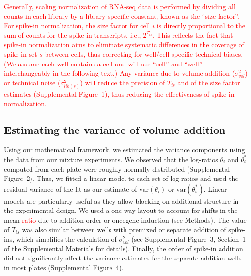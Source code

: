 \documentclass{article}
\newcommand{\suppfigschem}{1}
\newcommand{\suppfignorm}{2}
\newcommand{\suppfigtotals}{3}
\newcommand{\suppfigorder}{4}
\newcommand{\suppsecmath}{1}
\newcommand{\revised}[1]{\textcolor{red}{#1}}
\newcommand\variance{\mbox{var}}
\begin{document}
\revised{Generally, scaling normalization of RNA-seq data is performed by dividing all counts in each library by a library-specific constant, known as the ``size factor''.
For spike-in normalization, the size factor for cell $i$ is directly proportional to the sum of counts for the spike-in transcripts, i.e., $2^{T_{is}}$.
This reflects the fact that spike-in normalization aims to eliminate systematic differences in the coverage of spike-in set $s$ between cells, thus correcting for well/cell-specific technical biases.
(We assume each well contains a cell and will use ``cell'' and ``well'' interchangeably in the following text.)
Any variance due to volume addition ($\sigma^2_{vol}$) or technical noise ($\sigma^2_{lib(s)}$) will reduce the precision of $T_{is}$ and of the size factor estimates (Supplemental Figure~\suppfigschem{}), thus reducing the effectiveness of spike-in normalization.
}

\subsection*{Estimating the variance of volume addition}
Using our mathematical framework, we estimated the variance components using the data from our mixture experiments.
We observed that the log-ratios $\theta_i$ and $\theta^*_i$ computed from each plate were roughly normally distributed (Supplemental Figure~\suppfignorm{}).
Thus, we fitted a linear model to each set of log-ratios and used the residual variance of the fit as our estimate of $\variance(\theta_i)$ or $\variance(\theta^*_i)$.
Linear models are particularly useful as they allow blocking on additional structure in the experimental design.
We used a one-way layout to account for shifts in the mean \revised{ratio} due to addition order or oncogene induction (see Methods).
The value of $T_{is}$ was also similar between wells with premixed or separate addition of spike-ins, which simplifies the calculation of $\sigma^2_{vol}$ (see Supplemental Figure~\suppfigtotals{}, Section~\suppsecmath{} of the Supplemental Materials for details).
Finally, the order of spike-in addition did not significantly affect the variance estimates for the separate-addition wells in most plates (Supplemental Figure~\suppfigorder{}).
\end{document}
